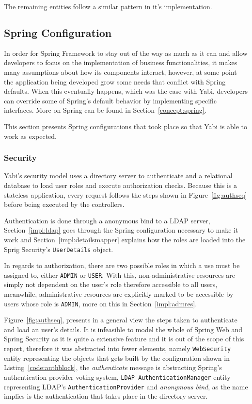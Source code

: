 The remaining entities follow a similar pattern in it's implementation.

\subsection{Spring Configuration}
In order for Spring Framework to stay out of the way as much as it can and allow developers to focus on the implementation of business functionalities, it makes many assumptions about how its components interact, however, at some point the application being developed grow some needs that conflict with Spring defaults. When this eventually happens, which was the case with \gls{Yabi}, developers can override some of Spring's default behavior by implementing specific interfaces. More on Spring can be found in Section~\ref{concept:spring}.

This section presents Spring configurations that took place so that \gls{Yabi} is able to work as expected.

\subsubsection{Security}
\gls{Yabi}'s security model uses a directory server to authenticate and a relational database to load user roles and execute authorization checks. Because this is a stateless application, every request follows the steps shown in Figure~\ref{fig:authseq} before being executed by the controllers.

Authentication is done through a anonymous bind to a \gls{LDAP} server, Section~\ref{impl:ldap} goes through the Spring configuration necessary to make it work and Section~\ref{impl:detailsmapper} explains how the roles are loaded into the Sprig Security's \texttt{UserDetails} object.

In regards to authorization, there are two possible roles in which a use must be assigned to, either \texttt{ADMIN} or \texttt{USER}. With this, non-administrative resources are simply not dependent on the user's role therefore accessible to all users, meanwhile, administrative resources are explicitly marked to be accessible by users whose role is \texttt{ADMIN}, more on this in Section~\ref{impl:admres}.

Figure~\ref{fig:authseq}, presents in a general view the steps taken to authenticate and load an user's details. It is infeasible to model the whole of Spring Web and Spring Security as it is quite a extensive feature and it is out of the scope of this report, therefore it was abstracted into fewer elements, namely \texttt{WebSecurity} entity representing the objects that gets built by the configuration shown in Listing~\ref{code:authblock}, the \textit{authenticate} message is abstracting Spring's authentication provider voting system, \texttt{LDAP AuthenticationManager} entity representing \gls{LDAP}'s \texttt{AuthenticationProvider} and \textit{anonymous bind}, as the name implies is the authentication that takes place in the directory server.

